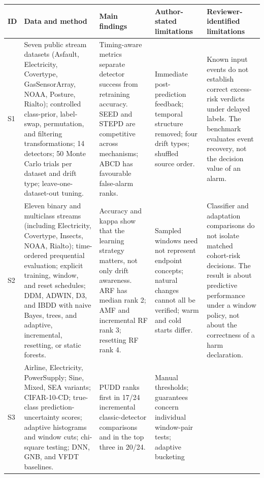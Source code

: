 \documentclass[
]{article}
\begin{document}
\begin{longtable}[]{@{}
  >{\raggedright\arraybackslash}p{}
  >{\raggedright\arraybackslash}p{}
  >{\raggedright\arraybackslash}p{}
  >{\raggedright\arraybackslash}p{}
  >{\raggedright\arraybackslash}p{}@{}}
\toprule
ID & Data and method & Main findings & Author-stated limitations &
Reviewer-identified limitations \\
\midrule
\endhead
S1 & Seven public stream datasets (Asfault, Electricity, Covertype,
GasSensorArray, NOAA, Posture, Rialto); controlled class-prior,
label-swap, permutation, and filtering transformations; 14 detectors; 50
Monte Carlo trials per dataset and drift type; leave-one-dataset-out
tuning. & Timing-aware metrics separate detector success from retraining
accuracy. SEED and STEPD are competitive across mechanisms; ABCD has
favourable false-alarm ranks. & Immediate post-prediction feedback;
temporal structure removed; four drift types; shuffled source order. &
Known input events do not establish correct excess-risk verdicts under
delayed labels. The benchmark evaluates event recovery, not the decision
value of an alarm. \\
S2 & Eleven binary and multiclass streams (including Electricity,
Covertype, Insects, NOAA, Rialto); time-ordered prequential evaluation;
explicit training, window, and reset schedules; DDM, ADWIN, D3, and IBDD
with naive Bayes, trees, and adaptive, incremental, resetting, or static
forests. & Accuracy and kappa show that the learning strategy matters,
not only drift awareness. ARF has median rank 2; AMF and incremental RF
rank 3; resetting RF rank 4. & Sampled windows need not represent
endpoint concepts; natural changes cannot all be verified; warm and cold
starts differ. & Classifier and adaptation comparisons do not isolate
matched cohort-risk decisions. The result is about predictive
performance under a window policy, not about the correctness of a harm
declaration. \\
S3 & Airline, Electricity, PowerSupply; Sine, Mixed, SEA variants;
CIFAR-10-CD; true-class prediction-uncertainty scores; adaptive
histograms and window cuts; chi-square testing; DNN, GNB, and VFDT
baselines. & PUDD ranks first in 17/24 incremental classic-detector
comparisons and in the top three in 20/24. & Manual thresholds;
guarantees concern individual window-pair tests; adaptive bucketing

\end{longtable}
\end{document}
